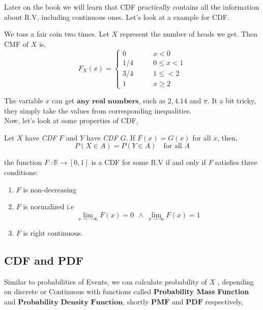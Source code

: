 Later on the book we will learn that CDF practically contains all the information about R.V, including continuous ones. Let's look at a example for CDF.

\begin{example}
    We toss a fair coin two times. Let $X$ represent the number of heads we get. Then CMF of $X$ is,
    \[F_X(x) = 
        \begin{cases} 
          0 \qquad &x < 0\\
          1/4 \qquad &0 \le x <1 \\
          3/4 \qquad &1 \leq < 2 \\
          1 \qquad &x \ge 2
        \end{cases} 
\]
\end{example}

The variable $x$ can get $\textbf{any real numbers}$, such as $2, 4.14$ and $\pi$. It a bit tricky, they simply take the values from corresponding inequalities.
\\
Now, let's look at some properties of CDF,
\begin{theorem}
    Let $X$ have \textit{CDF} $F$ and $Y$  have \textit{CDF} $G$. If $F(x)=G(x)$ for all $x$, then,
    \[ P(X \in A) = P(Y \in A) \quad \text{for all $A$} \] 
\end{theorem}

\begin{theorem}
    the function $F \ : \mathbb{R} \rightarrow [0,1]$ is a CDF for some R.V if and only if $F$ satisfies three conditions:
    \begin{enumerate}
        \item $F$ is non-decreasing
        \item $F$ is normalized i.e \[ \lim_{x \rightarrow -\infty} F(x) = 0\ \ \land \ \lim_{x \rightarrow \infty} F(x) =1 \]
        \item $F$ is right continuous.
    \end{enumerate}
\end{theorem}

\subsection*{CDF and PDF}
Similar to probabilities of Events, we can calculate probability of $X$ , depending on discrete or Continuous with functions called \textbf{ Probability Mass Function} and $\textbf{Probability Density Function}$, shortly $\textbf{PMF}$ and $\textbf{PDF}$ respectively,


